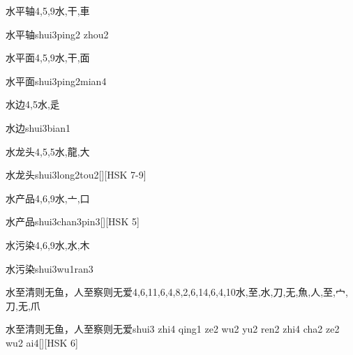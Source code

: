 \begin{Entry}{水平轴}{4,5,9}{⽔,⼲,⾞}
  \begin{Phonetics}{水平轴}{shui3ping2 zhou2}
  \end{Phonetics}
\end{Entry}

\begin{Entry}{水平面}{4,5,9}{⽔,⼲,⾯}
  \begin{Phonetics}{水平面}{shui3ping2mian4}
  \end{Phonetics}
\end{Entry}

\begin{Entry}{水边}{4,5}{⽔,⾡}
  \begin{Phonetics}{水边}{shui3bian1}
  \end{Phonetics}
\end{Entry}

\begin{Entry}{水龙头}{4,5,5}{⽔,⿓,⼤}
  \begin{Phonetics}{水龙头}{shui3long2tou2}[][HSK 7-9]
  \end{Phonetics}
\end{Entry}

\begin{Entry}{水产品}{4,6,9}{⽔,⼇,⼝}
  \begin{Phonetics}{水产品}{shui3chan3pin3}[][HSK 5]
  \end{Phonetics}
\end{Entry}

\begin{Entry}{水污染}{4,6,9}{⽔,⽔,⽊}
  \begin{Phonetics}{水污染}{shui3wu1ran3}
  \end{Phonetics}
\end{Entry}

\begin{Entry}{水至清则无鱼，人至察则无爱}{4,6,11,6,4,8,2,6,14,6,4,10}{⽔,⾄,⽔,⼑,⽆,⿂,⼈,⾄,⼧,⼑,⽆,⽖}
  \begin{Phonetics}{水至清则无鱼，人至察则无爱}{shui3 zhi4 qing1 ze2 wu2 yu2 ren2 zhi4 cha2 ze2 wu2 ai4}[][HSK 6]
  \end{Phonetics}
\end{Entry}

